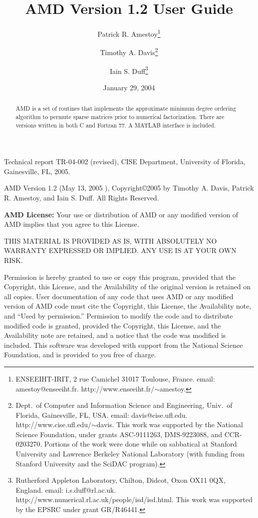 \documentclass[11pt]{article}
\begin{document}

\title{AMD Version 1.2 User Guide}
\author{Patrick R. Amestoy\thanks{ENSEEIHT-IRIT,
2 rue Camichel 31017 Toulouse, France.
email: amestoy@enseeiht.fr.  http://www.enseeiht.fr/$\sim$amestoy.}
\and Timothy A. Davis\thanks{
Dept.~of Computer and Information Science and Engineering,
Univ.~of Florida, Gainesville, FL, USA.
email: davis@cise.ufl.edu.
http://www.cise.ufl.edu/$\sim$davis.
This work was supported by the National
Science Foundation, under grants ASC-9111263, DMS-9223088, and CCR-0203270.
Portions of the work were done while on sabbatical at Stanford University
and Lawrence Berkeley National Laboratory (with funding from Stanford
University and the SciDAC program).
}
\and Iain S. Duff\thanks{Rutherford Appleton Laboratory, Chilton, Didcot, 
Oxon OX11 0QX, England. email: i.s.duff@rl.ac.uk.  
http://www.numerical.rl.ac.uk/people/isd/isd.html.
This work was supported by the EPSRC under grant GR/R46441.
}}

\date{January 29, 2004}
\maketitle

\begin{abstract}
AMD is a set of routines that implements the approximate minimum degree ordering
algorithm to permute sparse matrices prior to
numerical factorization.
There are versions written in both C and Fortran 77.
A MATLAB interface is included.
\end{abstract}

Technical report TR-04-002 (revised), CISE Department, University of Florida,
Gainesville, FL, 2005.

AMD Version 1.2 (May 13, 2005 ), Copyright\copyright 2005 by Timothy A.
Davis, Patrick R. Amestoy, and Iain S. Duff.  All Rights Reserved.

{\bf AMD License:}
    Your use or distribution of AMD or any modified version of
    AMD implies that you agree to this License.

    THIS MATERIAL IS PROVIDED AS IS, WITH ABSOLUTELY NO WARRANTY
    EXPRESSED OR IMPLIED.  ANY USE IS AT YOUR OWN RISK.

    Permission is hereby granted to use or copy this program, provided
    that the Copyright, this License, and the Availability of the original
    version is retained on all copies.  User documentation of any code that
    uses AMD or any modified version of AMD code must cite the
    Copyright, this License, the Availability note, and ``Used by permission.''
    Permission to modify the code and to distribute modified code is granted,
    provided the Copyright, this License, and the Availability note are
    retained, and a notice that the code was modified is included.  This
    software was developed with support from the National Science Foundation,
    and is provided to you free of charge.
\end{document}
